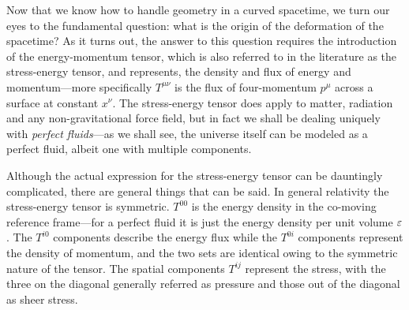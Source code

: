 Now that we know how to handle geometry in a curved spacetime, we turn our eyes to
the fundamental question: what is the origin of the deformation of the spacetime?
As it turns out, the answer to this question requires the introduction of the
energy-momentum tensor, which is also referred to in the literature as the stress-energy
tensor, and represents, the density and flux of energy and momentum---more specifically
$T^{\mu\nu}$ is the flux of four-momentum $p^\mu$ across a surface at constant $x^\nu$.
The stress-energy tensor does apply to matter, radiation and any non-gravitational force field, but in fact we shall
be dealing uniquely with \emph{perfect fluids}---as
we shall see, the universe itself can be modeled as a perfect fluid, albeit one with
multiple components.

Although the actual expression for the stress-energy tensor can be dauntingly complicated,
there are general things that can be said. In general relativity the stress-energy
tensor is symmetric. $T^{00}$ is the energy density in the co-moving reference
frame---for a perfect fluid it is just the energy density per unit volume $\varepsilon$.
The $T^{i0}$ components describe the energy flux while the $T^{0i}$ components represent
the density of momentum, and the two sets are identical owing to the symmetric nature
of the tensor. The spatial components $T^{ij}$ represent the stress, with the three
on the diagonal generally referred as pressure and those out of the diagonal as sheer stress.

